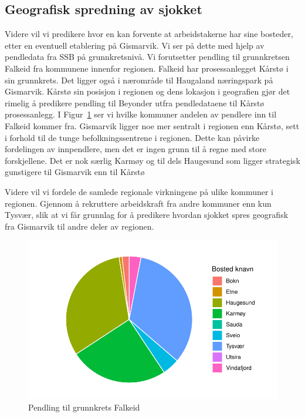 \documentclass[
]{article}
\begin{document}
\hypertarget{geografisk-spredning-av-sjokket}{%
\subsection{Geografisk spredning av
sjokket}\label{geografisk-spredning-av-sjokket}}

Videre vil vi predikere hvor en kan forvente at arbeidstakerne har sine
bosteder, etter en eventuell etablering på Gismarvik. Vi ser på dette
med hjelp av pendledata fra SSB på grunnkretsnivå. Vi forutsetter
pendling til grunnkretsen Falkeid fra kommunene innenfor regionen.
Falkeid har prosessanlegget Kårstø i sin grunnkrets. Det ligger også i
nærområde til Haugaland næringspark på Gismarvik. Kårstø sin posisjon i
regionen og dens lokasjon i geografien gjør det rimelig å predikere
pendling til Beyonder utfra pendledataene til Kårstø prosessanlegg. I
Figur~\ref{fig-kake-karsto} ser vi hvilke kommuner andelen av pendlere
inn til Falkeid kommer fra. Gismarvik ligger noe mer sentralt i regionen
enn Kårstø, sett i forhold til de tunge befolkningssentrene i regionen.
Dette kan påvirke fordelingen av innpendlere, men det er ingen grunn til
å regne med store forskjellene. Det er nok særlig Karmøy og til dels
Haugesund som ligger strategisk gunstigere til Gismarvik enn til Kårstø

Videre vil vi fordele de samlede regionale virkningene på ulike kommuner
i regionen. Gjennom å rekruttere arbeidskraft fra andre kommuner enn kun
Tysvær, slik at vi får grunnlag for å predikere hvordan sjokket spres
geografisk fra Gismarvik til andre deler av regionen.

\begin{figure}[H]

{\centering \includegraphics{Masteroppgave_files/figure-pdf/fig-kake-karsto-1.pdf}

}

\caption{\label{fig-kake-karsto}Pendling til grunnkrets Falkeid}

\end{figure}
\end{document}

